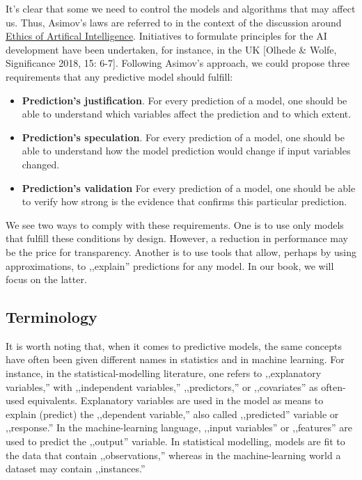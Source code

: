 \documentclass[12pt,]{krantz}
\providecommand{\tightlist}{%
  \setlength{\itemsep}{0pt}\setlength{\parskip}{0pt}}
\theoremstyle{definition}
\theoremstyle{definition}
\theoremstyle{definition}
\theoremstyle{remark}
\begin{document}
It's clear that some we need to control the models and algorithms that
may affect us. Thus, Asimov's laws are referred to in the context of the
discussion around
\href{https://en.wikipedia.org/wiki/Ethics_of_artificial_intelligence}{Ethics
of Artifical Intelligence}. Initiatives to formulate principles for the
AI development have been undertaken, for instance, in the UK {[}Olhede
\& Wolfe, Significance 2018, 15: 6-7{]}. Following Asimov's approach, we
could propose three requirements that any predictive model should
fulfill:

\begin{itemize}
\tightlist
\item
  \textbf{Prediction's justification}. For every prediction of a model,
  one should be able to understand which variables affect the prediction
  and to which extent.
\item
  \textbf{Prediction's speculation}. For every prediction of a model,
  one should be able to understand how the model prediction would change
  if input variables changed.
\item
  \textbf{Prediction's validation} For every prediction of a model, one
  should be able to verify how strong is the evidence that confirms this
  particular prediction.
\end{itemize}

We see two ways to comply with these requirements. One is to use only
models that fulfill these conditions by design. However, a reduction in
performance may be the price for transparency. Another is to use tools
that allow, perhaps by using approximations, to ,,explain'' predictions
for any model. In our book, we will focus on the latter.

\hypertarget{terminology}{%
\subsection{Terminology}\label{terminology}}

It is worth noting that, when it comes to predictive models, the same
concepts have often been given different names in statistics and in
machine learning. For instance, in the statistical-modelling literature,
one refers to ,,explanatory variables,'' with ,,independent variables,''
,,predictors,'' or ,,covariates'' as often-used equivalents. Explanatory
variables are used in the model as means to explain (predict) the
,,dependent variable,'' also called ,,predicted'' variable or
,,response.'' In the machine-learning language, ,,input variables'' or
,,features'' are used to predict the ,,output'' variable. In statistical
modelling, models are fit to the data that contain ,,observations,''
whereas in the machine-learning world a dataset may contain
,,instances.''
\end{document}
